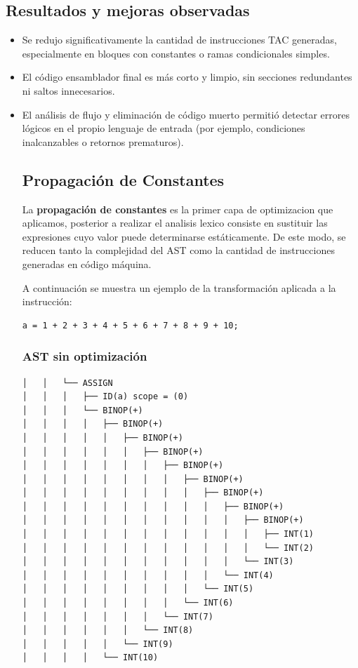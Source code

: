 \documentclass[12pt,a4paper]{article}
\begin{document}
\subsection{Resultados y mejoras observadas}
\begin{itemize}
    \item Se redujo significativamente la cantidad de instrucciones TAC generadas, especialmente en bloques con constantes o ramas condicionales simples.
    \item El código ensamblador final es más corto y limpio, sin secciones redundantes ni saltos innecesarios.
    \item El análisis de flujo y eliminación de código muerto permitió detectar errores lógicos en el propio lenguaje de entrada (por ejemplo, condiciones inalcanzables o retornos prematuros).
    \subsection{Propagación de Constantes}

La \textbf{propagación de constantes} es la primer capa de optimizacion que aplicamos, posterior a realizar el analisis lexico consiste en sustituir las expresiones cuyo valor puede determinarse estáticamente. De este modo, se reducen tanto la complejidad del AST como la cantidad de instrucciones generadas en código máquina.

A continuación se muestra un ejemplo de la transformación aplicada a la instrucción:

\begin{verbatim}
a = 1 + 2 + 3 + 4 + 5 + 6 + 7 + 8 + 9 + 10;
\end{verbatim}

\subsubsection*{AST sin optimización}

\begin{verbatim}
│   │   └── ASSIGN
│   │   │   ├── ID(a) scope = (0)
│   │   │   └── BINOP(+)
│   │   │   │   ├── BINOP(+)
│   │   │   │   │   ├── BINOP(+)
│   │   │   │   │   │   ├── BINOP(+)
│   │   │   │   │   │   │   ├── BINOP(+)
│   │   │   │   │   │   │   │   ├── BINOP(+)
│   │   │   │   │   │   │   │   │   ├── BINOP(+)
│   │   │   │   │   │   │   │   │   │   ├── BINOP(+)
│   │   │   │   │   │   │   │   │   │   │   ├── BINOP(+)
│   │   │   │   │   │   │   │   │   │   │   │   ├── INT(1)
│   │   │   │   │   │   │   │   │   │   │   │   └── INT(2)
│   │   │   │   │   │   │   │   │   │   │   └── INT(3)
│   │   │   │   │   │   │   │   │   │   └── INT(4)
│   │   │   │   │   │   │   │   │   └── INT(5)
│   │   │   │   │   │   │   │   └── INT(6)
│   │   │   │   │   │   │   └── INT(7)
│   │   │   │   │   │   └── INT(8)
│   │   │   │   │   └── INT(9)
│   │   │   │   └── INT(10)
\end{verbatim}


\end{itemize}
\end{document}
